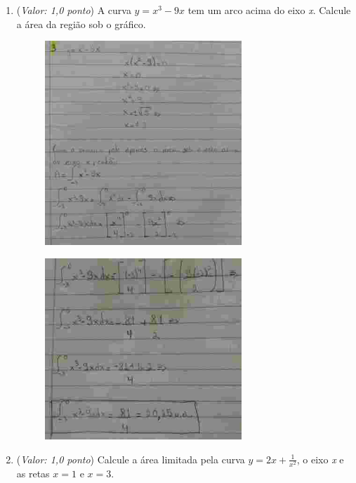 \documentclass[a4paper, 12pt]{article}
\begin{document}
\begin{enumerate}
\begin{description}
  \end{description}
\item ({\it Valor: 1,0 ponto}) A curva $ y = x^{3} - 9x $ tem um arco acima do eixo \emph{x}. Calcule a área da região sob o gráfico.
\begin{figure}[h!]
  \centering
  \includegraphics[width=0.7\textwidth]{resp3_1}
\end{figure}  

\begin{figure}[h!]
  \centering
  \includegraphics[width=0.7\textwidth]{resp3_2}
\end{figure}  

\item ({\it Valor: 1,0 ponto}) Calcule a área limitada pela curva $ y = 2x + \frac{1}{x^{2}} $, o eixo \emph{x} e as retas $ x = 1 $ e $ x = 3$.


\end{enumerate}
\end{document}
